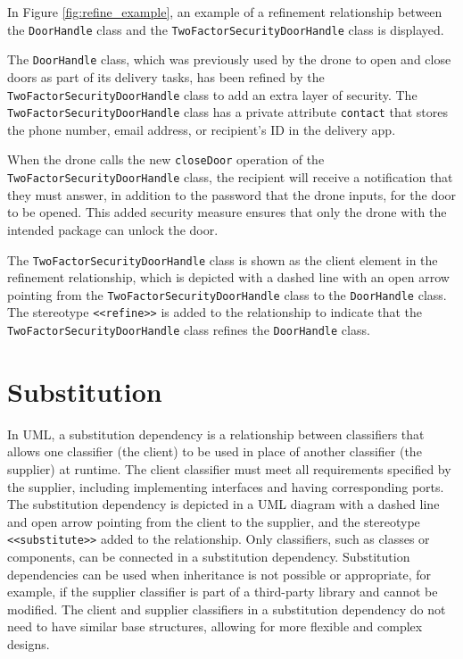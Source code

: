 \documentclass[
	12pt,
    a4paper,
    egregdoesnotlikesansseriftitles, %
    toc=chapterentrywithdots,
    oneside, openany,
    titlepage,
    parskip=half,
    headings=normal,  %
    listof=totoc,
    bibliography=totoc,
    index=totoc,
    captions=tableheading,  %
    listof=flat,
    numbers=noenddot, %
    final]
    {scrbook}
\begin{document}
In Figure \ref{fig:refine_example}, an example of a refinement relationship between the \texttt{DoorHandle} class and the \texttt{TwoFactorSecurityDoorHandle} class is displayed.

The \texttt{DoorHandle} class, which was previously used by the drone to open and close doors as part of its delivery tasks, has been refined by the \texttt{TwoFactorSecurityDoorHandle} class to add an extra layer of security. The \texttt{TwoFactorSecurityDoorHandle} class has a private attribute \texttt{contact} that stores the phone number, email address, or recipient's ID in the delivery app.

When the drone calls the new \texttt{closeDoor} operation of the \texttt{TwoFactorSecurityDoorHandle} class, the recipient will receive a notification that they must answer, in addition to the password that the drone inputs, for the door to be opened. This added security measure ensures that only the drone with the intended package can unlock the door.

The \texttt{TwoFactorSecurityDoorHandle} class is shown as the client element in the refinement relationship, which is depicted with a dashed line with an open arrow pointing from the \texttt{TwoFactorSecurityDoorHandle} class to the \texttt{DoorHandle} class. The stereotype \texttt{<<refine>>} is added to the relationship to indicate that the \texttt{TwoFactorSecurityDoorHandle} class refines the \texttt{DoorHandle} class.


\section{Substitution}
In UML, a substitution dependency is a relationship between classifiers that allows one classifier (the client) to be used in place of another classifier (the supplier) at runtime.
The client classifier must meet all requirements specified by the supplier, including implementing interfaces and having corresponding ports. 
The substitution dependency is depicted in a UML diagram with a dashed line and open arrow pointing from the client to the supplier, and the stereotype \texttt{<<substitute>>} added to the relationship. 
Only classifiers, such as classes or components, can be connected in a substitution dependency. 
Substitution dependencies can be used when inheritance is not possible or appropriate, for example, if the supplier classifier is part of a third-party library and cannot be modified. 
The client and supplier classifiers in a substitution dependency do not need to have similar base structures, allowing for more flexible and complex designs. \cite[p. 165]{uml}
\end{document}
